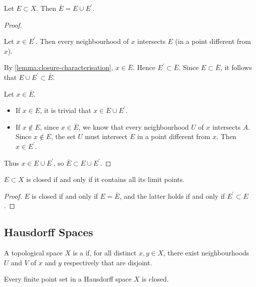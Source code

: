 \begin{proposition}
Let $E\subset X$. Then $\overline{E}=E\cup E^\prime$.
\end{proposition}

\begin{proof} \

\fbox{$\supset$} Let $x\in E^\prime$. Then every neighbourhood of $x$ intersects $E$ (in a point different from $x$).

By \ref{lemma:closure-characterisation}, $x\in\overline{E}$. Hence $E^\prime\subset\overline{E}$. Since $E\subset\overline{E}$, it follows that $E\cup E^\prime\subset\overline{E}$.

\fbox{$\subset$} Let $x\in\overline{E}$. 
\begin{itemize}
\item If $x\in E$, it is trivial that $x\in E\cup E^\prime$. 

\item If $x\notin E$, since $x\in\overline{E}$, we know that every neighbourhood $U$ of $x$ intersects $A$. Since $x\notin E$, the set $U$ must intersect $E$ in a point different from $x$. Then $x\in E^\prime$.
\end{itemize}
Thus $x\in E\cup E^\prime$, so $\overline{E}\subset E\cup E^\prime$.
\end{proof}

\begin{corollary}
$E\subset X$ is closed if and only if it contains all its limit points.
\end{corollary}

\begin{proof}
$E$ is closed if and only if $E=\overline{E}$, and the latter holds if and only if $E^\prime\subset E$.
\end{proof}
\pagebreak

\subsection{Hausdorff Spaces}
\begin{definition}
A topological space $X$ is a  if, for all distinct $x,y\in X$, there exist neighbourhoods $U$ and $V$ of $x$ and $y$ respectively that are disjoint.
\end{definition}

\begin{lemma}
Every finite point set in a Hausdorff space $X$ is closed.
\end{lemma}


